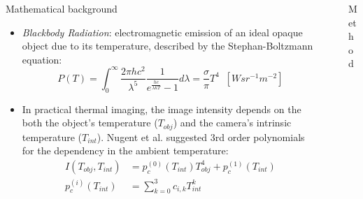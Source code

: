 \documentclass[final]{beamer}
\newlength{\sepwidth}
\newlength{\colwidth}
\newcommand{\separatorcolumn}{\begin{column}{\sepwidth}\end{column}}
\begin{document}
\begin{frame}[t]
\begin{columns}[t]
\begin{column}{\colwidth}
  \begin{exampleblock}{Mathematical background}
    \begin{itemize}
      \item \emph{Blackbody Radiation}: electromagnetic emission of an ideal opaque object due to its temperature, described by the Stephan-Boltzmann equation:
            \begin{equation*} \label{eq:stephan-boltzmann-ideal}
                P(T) = \int_0^\infty \frac{2\pi hc^2}{\lambda^5}\frac{1}{e^{\frac{hc}{\lambda kT}} - 1} d\lambda = \frac{\sigma}{\pi} T^4 \; \; \left[W sr^{-1} m^{-2}\right]
            \end{equation*}
      \item In practical thermal imaging, the image intensity depends on the both the object's temperature ($T_\mathit{obj}$) and the camera's intrinsic temperature ($T_\mathit{int}$). 
            Nugent et al. \cite{10.1117/1.OE.52.6.061304} suggested 3rd order polynomials for the dependency in the ambient temperature:
            \begin{equation*} \label{eq:IntensityVsTemperatures}
              \begin{split}            
                I(T_\mathit{obj}, T_\mathit{int}) &= p^{(0)}_c(T_\mathit{int}) T^4_\mathit{obj} + p^{(1)}_c(T_\mathit{int})\\
                p^{(i)}_c(T_\mathit{int}) &= \sum_{k=0}^3  c_{i,k} T_\mathit{int}^k
            \end{split}
            \end{equation*}
    \end{itemize}
  \end{exampleblock}

\end{column}

\separatorcolumn

\begin{column}{\colwidth}

  \begin{alertblock}{Method}


\end{alertblock}
\end{column}
\end{columns}
\end{frame}
\end{document}
